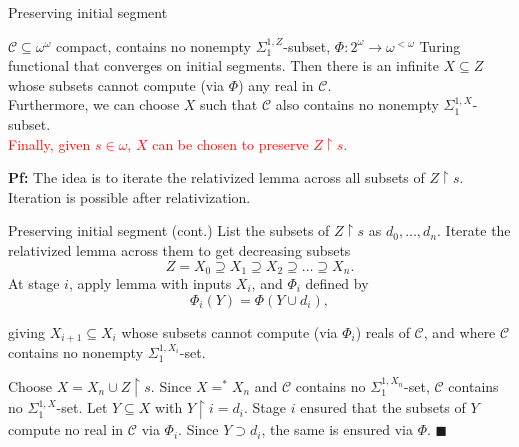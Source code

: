 \begin{frame}{Preserving initial segment}
  \begin{main-lemma*}
    $\mathcal{C}\subseteq\omega^\omega$ compact, contains no nonempty
    $\Sigma_1^{1,Z}$-subset, $\Phi:2^{\omega}\rightarrow \omega^{<\omega}$
    Turing functional that converges on initial segments. Then there is an
    infinite $X\subseteq Z$ whose subsets cannot compute (via $\Phi$) any
    real in $\mathcal{C}$.\\
    \vspace{0.5em}
    Furthermore, we can choose $X$ such that $\mathcal{C}$ also contains no
    nonempty $\Sigma_1^{1,X}$-subset.\\
    \vspace{0.5em}
    \textcolor{red}{Finally, given $s\in\omega$, $X$ can be chosen to preserve
    $Z\restriction s$.}
  \end{main-lemma*}

  \vspace{1em}
  \textbf{Pf:} The idea is to iterate the relativized lemma across all
  subsets of $Z\restriction s$. Iteration is possible after relativization.
\end{frame}

\begin{frame}{Preserving initial segment (cont.)}
  List the subsets of $Z\restriction s$ as $d_0,\ldots,d_n$. Iterate the
  relativized lemma across them to get decreasing subsets
  \[Z=X_0 \supseteq X_1 \supseteq X_2 \supseteq\ldots \supseteq X_n.\]
  At stage $i$, apply lemma with inputs $X_i$, and $\Phi_i$ defined by
  \[\Phi_i(Y) =\Phi(Y\cup d_i),\]

  giving $X_{i+1}\subseteq X_i$ whose subsets cannot compute (via
  $\Phi_i$) reals of $\mathcal{C}$, and where $\mathcal{C}$ contains no
  nonempty $\Sigma_1^{1,X_i}$-set.

  \vspace{1em}
  Choose $X=X_n\cup Z\restriction s$. Since $X=^*X_n$ and $\mathcal{C}$
  contains no $\Sigma_1^{1,X_n}$-set, $\mathcal{C}$ contains no
  $\Sigma_1^{1,X}$-set. Let $Y\subseteq X$ with $Y\restriction i=d_i$.
  Stage $i$ ensured that the subsets of $Y$ compute no real in
  $\mathcal{C}$ via $\Phi_i$. Since $Y\supset d_i$, the same is ensured via
  $\Phi$. $\blacksquare$
\end{frame}

